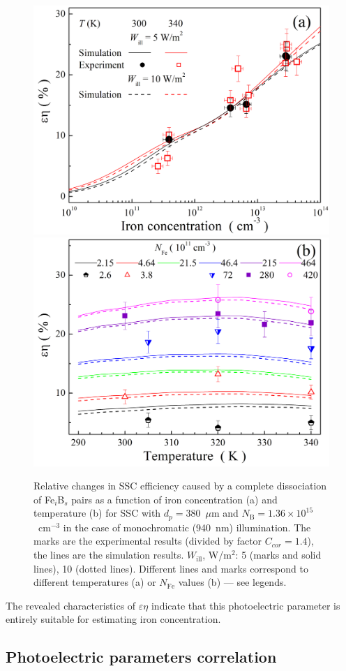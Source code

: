 \documentclass[a4paper,fleqn]{cas-sc}
\begin{document}
\begin{figure}
	\centering
     \includegraphics[width=0.4\linewidth]{Fig11a.png}
     \includegraphics[width=0.4\linewidth]{Fig11b.png}
	  \caption{Relative changes in SSC efficiency caused by a complete
       dissociation of Fe$_i$B$_s$ pairs as a function of iron concentration (a) and
       temperature (b) for SSC with $d_p=380$~$\mu$m and $N_\mathrm{B}=1.36\times10^{15}$~cm$^{-3}$
       in the case of monochromatic (940~nm) illumination.
       The marks are the experimental results (divided by factor $C_{cor}=1.4$), the lines are the simulation results.
       $W_\mathrm{ill}$, W/m$^{2}$: 5 (marks and solid lines), 10 (dotted lines).
       Different lines and marks correspond to different temperatures (a) or $N_\mathrm{Fe}$ values (b) --- see legends.
}\label{fig11}
\end{figure}

The revealed characteristics of $\varepsilon \eta$ indicate that this photoelectric parameter
is entirely suitable for estimating iron concentration.


\subsection{Photoelectric parameters correlation}
\end{document}
